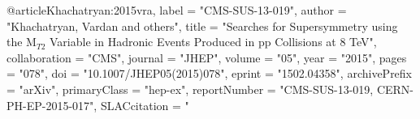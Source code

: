 @article{Khachatryan:2015vra,
      label          = "CMS-SUS-13-019",
      author         = "Khachatryan, Vardan and others",
      title          = "{Searches for Supersymmetry using the M$_{T2}$ Variable
                        in Hadronic Events Produced in pp Collisions at 8 TeV}",
      collaboration  = "CMS",
      journal        = "JHEP",
      volume         = "05",
      year           = "2015",
      pages          = "078",
      doi            = "10.1007/JHEP05(2015)078",
      eprint         = "1502.04358",
      archivePrefix  = "arXiv",
      primaryClass   = "hep-ex",
      reportNumber   = "CMS-SUS-13-019, CERN-PH-EP-2015-017",
      SLACcitation   = "%
}

